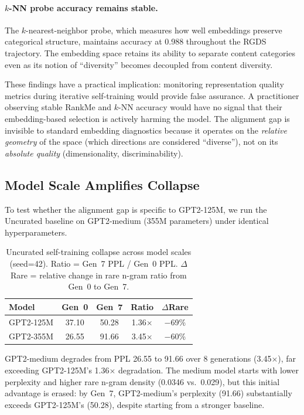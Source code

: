 \paragraph{$k$-NN probe accuracy remains stable.} The $k$-nearest-neighbor probe, which measures how well embeddings preserve categorical structure, maintains accuracy at 0.988 throughout the RGDS trajectory. The embedding space retains its ability to separate content categories even as its notion of ``diversity'' becomes decoupled from content diversity.

These findings have a practical implication: monitoring representation quality metrics during iterative self-training would provide false assurance. A practitioner observing stable RankMe and $k$-NN accuracy would have no signal that their embedding-based selection is actively harming the model. The alignment gap is invisible to standard embedding diagnostics because it operates on the \textit{relative geometry} of the space (which directions are considered ``diverse''), not on its \textit{absolute quality} (dimensionality, discriminability).

\subsection{Model Scale Amplifies Collapse}
\label{sec:scale}

To test whether the alignment gap is specific to GPT2-125M, we run the Uncurated baseline on GPT2-medium (355M parameters) under identical hyperparameters.

\begin{table}[t]
\centering
\small
\begin{tabular}{lcccc}
\toprule
\textbf{Model} & \textbf{Gen~0} & \textbf{Gen~7} & \textbf{Ratio} & \textbf{$\Delta$Rare} \\
\midrule
GPT2-125M & 37.10 & 50.28 & 1.36$\times$ & $-$69\% \\
GPT2-355M & 26.55 & 91.66 & 3.45$\times$ & $-$60\% \\
\bottomrule
\end{tabular}
\caption{Uncurated self-training collapse across model scales (seed=42). Ratio = Gen~7 PPL / Gen~0 PPL. $\Delta$Rare = relative change in rare n-gram ratio from Gen~0 to Gen~7.}
\label{tab:scale}
\end{table}

GPT2-medium degrades from PPL 26.55 to 91.66 over 8 generations (3.45$\times$), far exceeding GPT2-125M's 1.36$\times$ degradation. The medium model starts with lower perplexity and higher rare n-gram density (0.0346 vs.\ 0.029), but this initial advantage is erased: by Gen~7, GPT2-medium's perplexity (91.66) substantially exceeds GPT2-125M's (50.28), despite starting from a stronger baseline.

